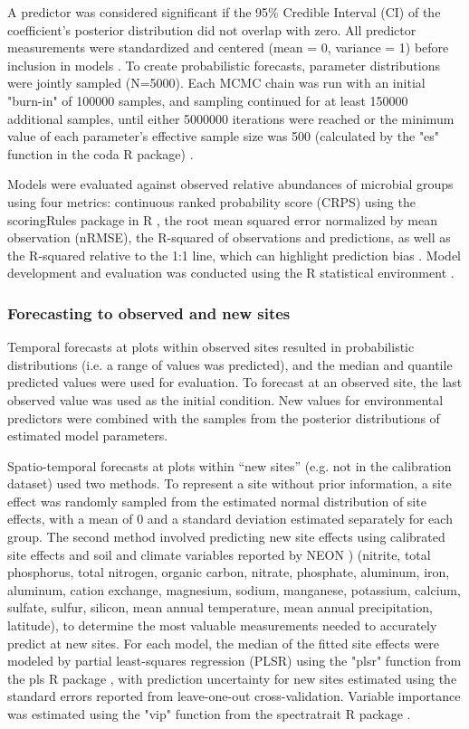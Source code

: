 \documentclass[11pt]{article}
\begin{document}
A predictor was considered significant if the 95\% Credible Interval (CI) of the coefficient’s posterior distribution did not overlap with zero. All predictor measurements were standardized and centered (mean = 0, variance = 1) before inclusion in models \cite{enders_centering_2007}. To create probabilistic forecasts, parameter distributions were jointly sampled (N=5000). Each MCMC chain was run with an initial "burn-in" of 100000 samples, and sampling continued for at least 150000 additional samples, until either 5000000 iterations were reached or the minimum value of each parameter's effective sample size was 500 (calculated by the "es" function in the coda R package) \cite{plummer_coda_2006}.

Models were evaluated against observed relative abundances of microbial groups using four metrics: continuous ranked probability score (CRPS) using the scoringRules package in R \cite{jordan_evaluating_2019}, the root mean squared error normalized by mean observation (nRMSE), the R-squared of observations and predictions, as well as the R-squared relative to the 1:1 line, which can highlight prediction bias \cite{averill_soil_2021}. Model development and evaluation was conducted using the R statistical environment \cite{r_development_core_team_r_2008}.

\subsubsection{Forecasting to observed and new sites}

Temporal forecasts at plots within observed sites resulted in probabilistic distributions (i.e. a range of values was predicted), and the median and quantile predicted values were used for evaluation. To forecast at an observed site, the last observed value was used as the initial condition. New values for environmental predictors were combined with the samples from the posterior distributions of estimated model parameters.

Spatio-temporal forecasts at plots within “new sites” (e.g. not in the calibration dataset) used two methods. To represent a site without prior information, a site effect was randomly sampled from the estimated normal distribution of site effects, with a mean of 0 and a standard deviation estimated separately for each group. The second method involved predicting new site effects using calibrated site effects and soil and climate variables reported by NEON \cite{noauthor_national_2020}) (nitrite, total phosphorus, total nitrogen, organic carbon, nitrate, phosphate, aluminum, iron, aluminum, cation exchange, magnesium, sodium, manganese, potassium, calcium, sulfate, sulfur, silicon, mean annual temperature, mean annual precipitation, latitude), to determine the most valuable measurements needed to accurately predict at new sites. For each model, the median of the fitted site effects were modeled by partial least-squares regression (PLSR) using the "plsr" function from the pls R package \cite{liland_pls_2023}, with prediction uncertainty for new sites estimated using the standard errors reported from leave-one-out cross-validation. Variable importance was estimated using the "vip" function from the spectratrait R package \cite{lamour_spectratrait_2023}.
\end{document}
